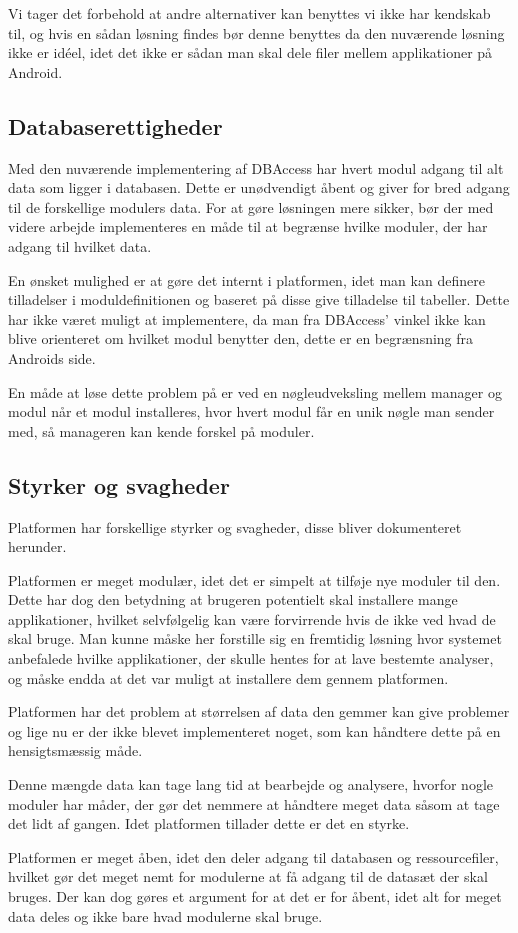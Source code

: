 Vi tager det forbehold at andre alternativer kan benyttes vi ikke har kendskab til, og hvis en sådan løsning findes bør denne benyttes da den nuværende løsning ikke er idéel, idet det ikke er sådan man skal dele filer mellem applikationer på Android.

\subsection{Databaserettigheder}\label{databaserettigheder}
Med den nuværende implementering af DBAccess har hvert modul adgang til alt data som ligger i databasen.
Dette er unødvendigt åbent og giver for bred adgang til de forskellige modulers data.
For at gøre løsningen mere sikker, bør der med videre arbejde implementeres en måde til at begrænse hvilke moduler, der har adgang til hvilket data.

En ønsket mulighed er at gøre det internt i platformen, idet man kan definere tilladelser i moduldefinitionen og baseret på disse give tilladelse til tabeller. 
Dette har ikke været muligt at implementere, da man fra DBAccess' vinkel ikke kan blive orienteret om hvilket modul benytter den, dette er en begrænsning fra Androids side.

En måde at løse dette problem på er ved en nøgleudveksling mellem manager og modul når et modul installeres, hvor hvert modul får en unik nøgle man sender med, så manageren kan kende forskel på moduler.

\subsection{Styrker og svagheder}
Platformen har forskellige styrker og svagheder, disse bliver dokumenteret herunder. 

Platformen er meget modulær, idet det er simpelt at tilføje nye moduler til den. %
Dette har dog den betydning at brugeren potentielt skal installere mange applikationer, hvilket selvfølgelig kan være forvirrende hvis de ikke ved hvad de skal bruge. %
Man kunne måske her forstille sig en fremtidig løsning hvor systemet anbefalede hvilke applikationer, der skulle hentes for at lave bestemte analyser, og måske endda at det var muligt at installere dem gennem platformen.

Platformen har det problem at størrelsen af data den gemmer kan give problemer og lige nu er der ikke blevet implementeret noget, som kan håndtere dette på en hensigtsmæssig måde. %

Denne mængde data kan tage lang tid at bearbejde og analysere, hvorfor nogle moduler har måder, der gør det nemmere at håndtere meget data såsom at tage det lidt af gangen.
Idet platformen tillader dette er det en styrke. %

Platformen er meget åben, idet den deler adgang til databasen og ressourcefiler, hvilket gør det meget nemt for modulerne at få adgang til de datasæt der skal bruges. 
Der kan dog gøres et argument for at det er for åbent, idet alt for meget data deles og ikke bare hvad modulerne skal bruge. 